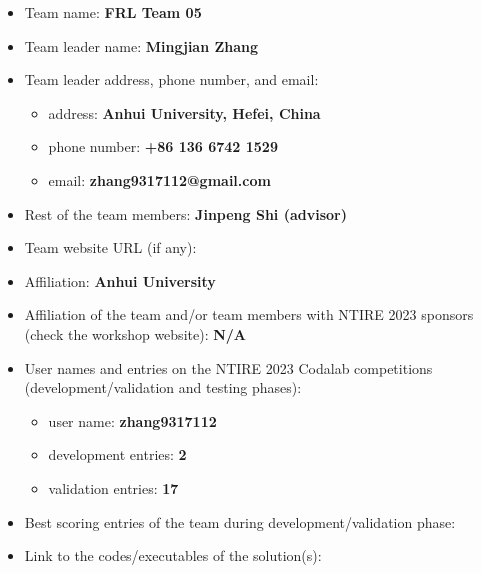 \documentclass[10pt,twocolumn,letterpaper]{article}
\begin{document}
\begin{itemize}
	\item Team name: \textbf{FRL Team 05}                                  
	\item Team leader name: \textbf{Mingjian Zhang }                          
	\item Team leader address, phone number, and email:
	\begin{itemize}
		\item address: \textbf{Anhui University, Hefei, China}
		\item phone number: \textbf{+86 136 6742 1529}
		\item email: \textbf{zhang9317112@gmail.com}
	\end{itemize}
	\item Rest of the team members: \textbf{Jinpeng Shi (advisor)}        
	\item Team website URL (if any): \\                    
	\item Affiliation: \textbf{Anhui University}
	\item Affiliation of the team and/or team members with NTIRE 2023 sponsors (check the workshop website): \textbf{N/A}
	\item User names and entries on the NTIRE 2023 Codalab competitions (development/validation and testing phases):
	\begin{itemize}
		\item user name: \textbf{zhang9317112}
		\item development entries: \textbf{2}
		\item validation entries: \textbf{17}
	\end{itemize}
	\item Best scoring entries of the team during development/validation phase:
	\begin{table}[h]
		\centering
	\end{table}
	\item Link to the codes/executables of the solution(s): \\ 
\end{itemize}
\end{document}

